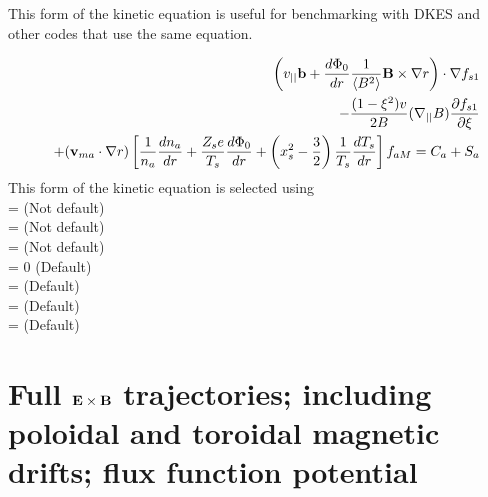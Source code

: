 This form of the kinetic equation is useful for benchmarking with DKES and other codes
that use the same equation.

\begin{eqnarray}
&&\left(v_{||}{\mathbf b} + \frac{d\Phi_0}{dr} \frac{1}{\left< B^2\right>} {\mathbf B}\times\nabla r \right) \cdot \nabla f_{s1} \\
&& - \frac{(1-\xi^2)v}{2B} (\nabla_{||} B)
 \frac{\partial f_{s1}}{\partial \xi} \nonumber \\
&&+ ({\mathbf v}_{ma} \cdot \nabla r) \left[ \frac{1}{n_a} \frac{dn_a}{dr} + \frac{Z_s e}{T_s} \frac{d\Phi_0}{dr} + \left(x_s^2-\frac{3}{2}\right) \frac{1}{T_s} \frac{dT_s}{dr}\right] f_{aM}
 = C_a + S_a \nonumber
\end{eqnarray}
This form of the kinetic equation is selected using \\
 = \false  \;\;\; (Not default) \\
 = \false \;\;\; (Not default) \\
 = \true \;\;\; (Not default) \\
 = 0 \;\;\; (Default) \\
 = \false \;\;\; (Default) \\
 = \false \;\;\; (Default) \\
 = \false \;\;\; (Default)



\section{Full ${\mathbf E}\times{\mathbf B}$ trajectories; including poloidal and toroidal magnetic drifts; flux function potential}

